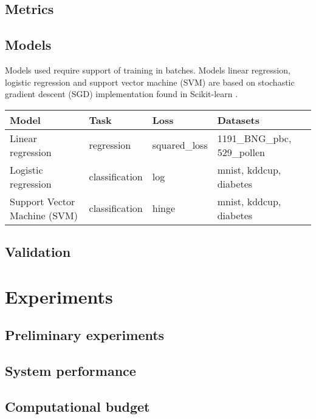 \subsection{Metrics}
\subsection{Models}

Models used require support of training in batches. Models linear regression, logistic regression and support vector machine (SVM) are based on stochastic gradient descent (SGD) implementation found in Scikit-learn \parencite{pedregosaScikitlearnMachineLearning2011}.

\begin{table}[h]
    \label{table:models}
    \centering
    \begin{tabular}{llll}
        \toprule
        Model                        & Task           & Loss          & Datasets                    \\
        \midrule
        Linear regression            & regression     & squared\_loss & 1191\_BNG\_pbc, 529\_pollen \\
        Logistic regression          & classification & log           & mnist, kddcup, diabetes     \\
        Support Vector Machine (SVM) & classification & hinge         & mnist, kddcup, diabetes     \\
        \bottomrule
    \end{tabular}
\end{table}



\subsection{Validation}


\section{Experiments}
\label{sec:experiments}

\subsection{Preliminary experiments}
\subsection{System performance}
\subsection{Computational budget}

